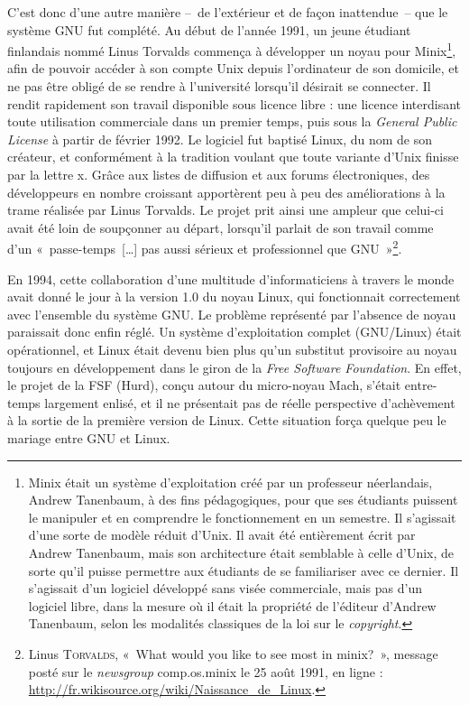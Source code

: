 \documentclass{FramateX}
\begin{document}
\begin{refsection}
C'est donc d'une autre manière –~de
l'extérieur et de façon inattendue~– que le système
GNU fut complété. Au début de l'année 1991, un jeune étudiant
finlandais nommé Linus Torvalds commença à développer un noyau pour
Minix\footnote{Minix était un système d'exploitation créé par un
professeur néerlandais, Andrew Tanenbaum, à des fins pédagogiques, pour
que ses étudiants puissent le manipuler et en comprendre le
fonctionnement en un semestre. Il s'agissait d'une sorte de modèle
réduit d'Unix. Il avait été entièrement écrit par Andrew Tanenbaum,
mais son architecture était semblable à celle d'Unix, de sorte qu'il
puisse permettre aux étudiants de se familiariser avec ce dernier. Il
s'agissait d'un logiciel développé sans visée commerciale, mais pas
d'un logiciel libre, dans la mesure où il était la
propriété de l'éditeur d'Andrew Tanenbaum, selon les modalités
classiques de la loi sur le \textit{copyright}.}, afin de pouvoir
accéder à son compte Unix depuis l'ordinateur de son domicile, et ne
pas être obligé de se rendre à l'université lorsqu'il désirait se
connecter. Il rendit rapidement son travail disponible sous licence
libre : une licence interdisant toute utilisation commerciale dans un
premier temps, puis sous la \textit{General Public License} à partir de
février 1992. Le logiciel fut baptisé Linux, du nom de son créateur, et
conformément à la tradition voulant que toute variante d'Unix finisse
par la lettre x. Grâce aux listes de diffusion et aux forums
électroniques, des développeurs en nombre croissant apportèrent peu à
peu des améliorations à la trame réalisée par Linus Torvalds. Le projet
prit ainsi une ampleur que celui-ci avait été loin de soupçonner au
départ, lorsqu'il parlait de son travail comme d'un «~passe-temps~[…]
pas aussi sérieux et professionnel que GNU~»\footnote{Linus
\textsc{Torvalds}, «~What would you like to see most in minix?~», message posté sur le \textit{newsgroup} comp.os.minix le 25 août 1991, en
ligne : \url{http://fr.wikisource.org/wiki/Naissance\_de\_Linux}.}. 

En 1994, cette collaboration d'une multitude d'informaticiens à travers
le monde avait donné le jour à la version 1.0 du noyau Linux, qui
fonctionnait correctement avec l'ensemble du système GNU. Le problème
représenté par l'absence de noyau paraissait donc enfin réglé. Un
système d'exploitation complet (GNU/Linux) était opérationnel, et Linux
était devenu bien plus qu'un substitut provisoire au noyau toujours en
développement dans le giron de la \textit{Free Software Foundation}. En
effet, le projet de la FSF (Hurd), conçu autour du micro-noyau Mach,
s'était entre-temps largement enlisé, et il ne présentait pas de réelle
perspective d'achèvement à la sortie de la première version de Linux.
Cette situation força quelque peu le mariage entre GNU et Linux. 


\end{refsection}
\end{document}
